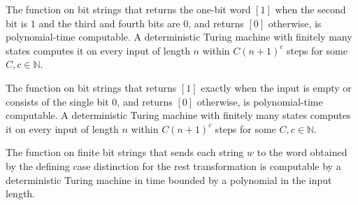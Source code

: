 \begin{theorem}
\label{Randomized.PIT.polyTimeComputable_isMulW}
\leanok
{}
The function on bit strings that returns the one-bit word $[1]$ when the second bit is
$1$ and the third and fourth bits are $0$, and returns $[0]$ otherwise, is
polynomial-time computable. A deterministic Turing machine with finitely many states
computes it on every input of length $n$ within $C(n+1)^c$ steps for some
$C,c\in\mathbb{N}$.
\end{theorem}

\begin{theorem}
\label{Randomized.PIT.polyTimeComputable_isDone}
\leanok
{}
The function on bit strings that returns $[1]$ exactly when the input is empty or
consists of the single bit $0$, and returns $[0]$ otherwise, is polynomial-time
computable. A deterministic Turing machine with finitely many states computes it on
every input of length $n$ within $C(n+1)^c$ steps for some $C,c\in\mathbb{N}$.
\end{theorem}

\begin{theorem}
\label{Randomized.PIT.polyTimeComputable_restW}
\leanok
{}
The function on finite bit strings that sends each string $w$ to the word obtained by
the defining case distinction for the rest transformation is computable by a
deterministic Turing machine in time bounded by a polynomial in the input length.
\end{theorem}

